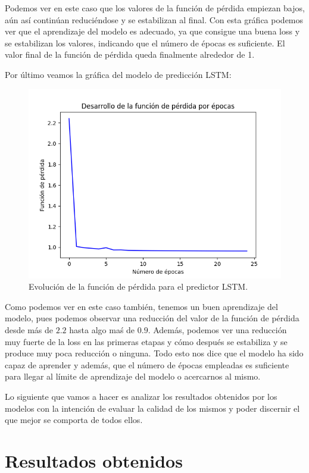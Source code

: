 Podemos ver en este caso que los valores de la función de pérdida empiezan bajos, aún así continúan reduciéndose y se estabilizan al final. Con esta gráfica podemos ver que el aprendizaje del modelo es adecuado, ya que consigue una buena loss y se estabilizan los valores, indicando que el número de épocas es suficiente. El valor final de la función de pérdida queda finalmente alrededor de 1.

Por último veamos la gráfica del modelo de predicción LSTM:
\begin{figure}[H]
	\centering
	\includegraphics[scale=0.75]{imagenes/loss_lstm_forecasting.png}
	\caption{Evolución de la función de pérdida para el predictor LSTM.}
	\label{img:loss-lstm-forecaster}
\end{figure}

Como podemos ver en este caso también, tenemos un buen aprendizaje del modelo, pues podemos observar una reducción del valor de la función de pérdida desde más de $2.2$ hasta algo maś de $0.9$. Además, podemos ver una reducción muy fuerte de la loss en las primeras etapas y cómo después se estabiliza y se produce muy poca reducción o ninguna. Todo esto nos dice que el modelo ha sido capaz de aprender y además, que el número de épocas empleadas es suficiente para llegar al límite de aprendizaje del modelo o acercarnos al mismo.

Lo siguiente que vamos a hacer es analizar los resultados obtenidos por los modelos con la intención de evaluar la calidad de los mismos y poder discernir el que mejor se comporta de todos ellos.

\section{Resultados obtenidos}

